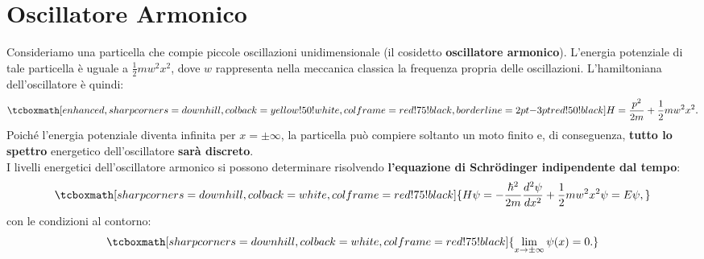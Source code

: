 \chapter[Oscillatore Armonico]{Oscillatore Armonico}
Consideriamo una particella che compie piccole oscillazioni unidimensionale (il cosidetto \textbf{oscillatore armonico}). L'energia potenziale di tale particella è uguale a $\frac{1}{2}mw^2x^2$, dove $w$ rappresenta nella meccanica classica la frequenza propria delle oscillazioni. L'hamiltoniana dell'oscillatore è quindi:
	\begin{equation}
		\tcboxmath[enhanced, sharp corners=downhill, colback=yellow!50!white, colframe=red!75!black, borderline={2pt}{-3pt}{red!50!black}]{
			H=\frac{p^2}{2m}+\frac{1}{2}mw^2x^2.
			}
	\label{eq:cap11_1}
	\end{equation}
Poiché l'energia potenziale diventa infinita per $x=\pm \infty$, la particella può compiere soltanto un moto finito e, di conseguenza,  \textbf{tutto lo spettro} energetico dell'oscillatore \textbf{sarà discreto}.\\

 I livelli energetici dell'oscillatore armonico si possono determinare risolvendo \textbf{l'equazione di Schr\"{o}dinger indipendente dal tempo}:
	\begin{equation}
		\tcboxmath[sharp corners=downhill, colback=white, colframe=red!75!black]{	
			H\psi= -\frac{\hbar^2}{2m}\frac{d^2\psi}{dx^2}+\frac{1}{2}mw^2x^2\psi=E\psi,
			}
	\end{equation}
con le condizioni al contorno:
	\begin{equation}
		\tcboxmath[sharp corners=downhill, colback=white, colframe=red!75!black]{
			\lim _{x \rightarrow \pm \infty} \psi(x)=0.
			}
	\end{equation}\\
	

